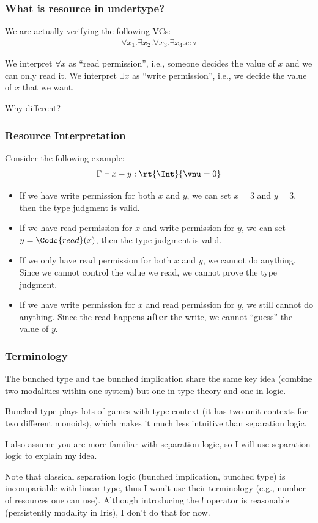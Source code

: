 \begin{frame}
\frametitle{What is resource in undertype?}

We are actually verifying the following VCs: 
\begin{align*}
\forall x_1. \exists x_2. \forall x_3. \exists x_4. e : \tau 
\end{align*}

We interpret $\forall x$ as ``read permission'', i.e., someone decides the value of 
$x$ and we can only read it. We interpret $\exists x$ as ``write permission'', i.e., we decide the value of $x$ that we want.

Why different?

\end{frame}

\begin{frame}
    \frametitle{Resource Interpretation}
    
Consider the following example:
\begin{align*}
    \Gamma \vdash x - y : \rt{\Int}{\vnu = 0}
\end{align*}
\begin{itemize}
    \item If we have write permission for both $x$ and $y$, we can set $x = 3$ and $y = 3$, then the type judgment is valid.
    \item If we have read permission for $x$ and write permission for $y$, we can set $y = \Code{read}(x)$, then the type judgment is valid.
    \item If we only have read permission for both $x$ and $y$, we cannot do anything. Since we cannot control the value we read, we cannot prove the type judgment.
    \item If we have write permission for $x$ and read permission for $y$, we still cannot do anything. Since the read happens \textbf{after} the write, we cannot ``guess'' the value of $y$.
\end{itemize}
    
\end{frame}

\begin{frame}
    \frametitle{Terminology}
    
The bunched type and the bunched implication share the same key idea (combine two modalities within one system) but one in type theory and one in logic. 

Bunched type plays lots of games with type context (it has two unit contexts for two different monoids), which makes it much less intuitive than separation logic. 

I also assume you are more familiar with separation logic, so I will use separation logic to explain my idea.

Note that classical separation logic (bunched implication, bunched type) is incompariable with linear type, thus I won't use their terminology (e.g., number of resources one can use). Although introducing the $!$ operator is reasonable (persistently modality in Iris), I don't do that for now.
    
\end{frame}

